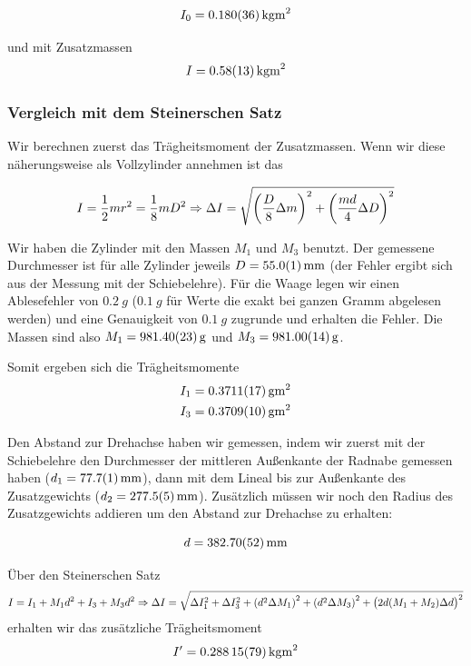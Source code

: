 \documentclass[a4paper,german,12pt,smallheadings]{scrartcl}
\begin{document}
\begin{equation}
  I_0 = \SI{0.180+-0.036}{kg m^2}
\end{equation}

und mit Zusatzmassen
\begin{equation}
  I = \SI{0.58+-0.13}{kg m^2}
\end{equation}

\subsubsection{Vergleich mit dem Steinerschen Satz}
Wir berechnen zuerst das Trägheitsmoment der Zusatzmassen. Wenn wir diese
näherungsweise als Vollzylinder annehmen ist das

\begin{equation}
  I = \frac{1}{2} m r^2 = \frac{1}{8} mD^2 \Rightarrow
  \Delta I = \sqrt{\del{\frac{D}{8} \Delta m}^2 + \del{\frac{md}{4} \Delta D}^2}
\end{equation}

Wir haben die Zylinder mit den Massen $M_1$ und $M_3$ benutzt. Der gemessene
Durchmesser ist für alle Zylinder jeweils $D = \SI{55.0+-0.1}{mm}$ (der Fehler
ergibt sich aus der Messung mit der Schiebelehre). Für die Waage legen wir
einen Ablesefehler von $\SI{0.2}{g}$ ($\SI{0.1}{g}$ für Werte die exakt bei
ganzen Gramm abgelesen werden) und eine Genauigkeit von $\SI{0.1}{g}$ zugrunde
und erhalten die Fehler. Die Massen sind also $M_1 = \SI{981.4+-0.23}{g}$ und $M_3 =
\SI{981.0+-0.14}{g}$.

Somit ergeben sich die Trägheitsmomente
\begin{align*}
  I_1 &= \SI{0.3711+-0.0017}{g m^2} \\
  I_3 &= \SI{0.3709+-0.0010}{g m^2}
\end{align*}

Den Abstand zur Drehachse haben wir gemessen, indem wir zuerst mit der
Schiebelehre den Durchmesser der mittleren Außenkante der Radnabe gemessen
haben ($d_1 = \SI{77.7+-0.1}{mm}$), dann mit dem Lineal bis zur Außenkante des
Zusatzgewichts ($d_2 = \SI{277.5+-0.5}{mm}$). Zusätzlich müssen wir noch den
Radius des Zusatzgewichts addieren um den Abstand zur Drehachse zu erhalten:

\begin{equation}
  d = \SI{382.70\pm0.52}{mm}
\end{equation}

Über den Steinerschen Satz
\begin{equation}
  I = I_1 + M_1 d^2 + I_3 + M_3 d^2 \Rightarrow
  \Delta I = \sqrt{\Delta I_1^2 + \Delta I_3^2 + \del{d^2 \Delta M_1}^2 +
  \del{d^2 \Delta M_3}^2 + \del{2d (M_1+M_2) \Delta d}^2}
\end{equation}
erhalten wir das zusätzliche Trägheitsmoment
\begin{equation}
  I' = \SI{0.28815+-0.00079}{kg m^2}
\end{equation}
\end{document}
